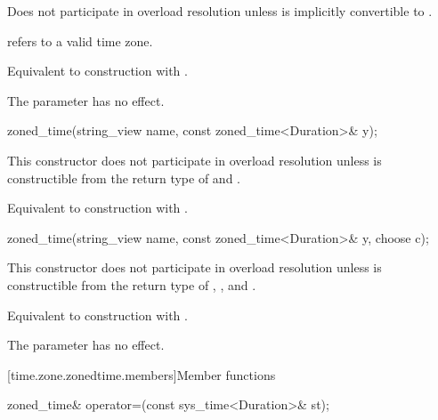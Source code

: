 \begin{itemdescr}
\pnum
\remarks
Does not participate in overload resolution unless
 is implicitly convertible to .

\pnum
\requires {} refers to a valid time zone.

\pnum
\effects
Equivalent to construction with .

\pnum
\begin{note}
The  parameter has no effect.
\end{note}
\end{itemdescr}

\begin{itemdecl}
zoned_time(string_view name, const zoned_time<Duration>& y);
\end{itemdecl}

\begin{itemdescr}
\pnum
\remarks
This constructor does not participate in overload resolution unless
 is constructible from the return type of  and .

\pnum
\effects
Equivalent to construction with .
\end{itemdescr}

\begin{itemdecl}
zoned_time(string_view name, const zoned_time<Duration>& y, choose c);
\end{itemdecl}

\begin{itemdescr}
\pnum
\remarks
This constructor does not participate in overload resolution unless
 is constructible from
the return type of , , and .

\pnum
\effects
Equivalent to construction with .

\pnum
\begin{note}
The  parameter has no effect.
\end{note}
\end{itemdescr}
%

[time.zone.zonedtime.members]{Member functions}

%
\begin{itemdecl}
zoned_time& operator=(const sys_time<Duration>& st);
\end{itemdecl}

